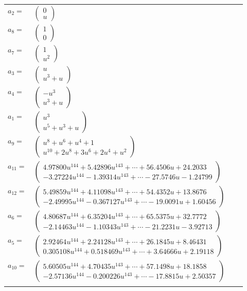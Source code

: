 \documentclass[1p]{elsarticle_modified}
\theoremstyle{definition}
\begin{document}
\begin{tabular}{m{7pt} m{180pt} m{7pt} m{180pt} }
\flushright $a_{2}=$&$\begin{pmatrix}0\\u\end{pmatrix}$ \\
\flushright $a_{8}=$&$\begin{pmatrix}1\\0\end{pmatrix}$ \\
\flushright $a_{7}=$&$\begin{pmatrix}1\\u^2\end{pmatrix}$ \\
\flushright $a_{3}=$&$\begin{pmatrix}u\\u^3+u\end{pmatrix}$ \\
\flushright $a_{4}=$&$\begin{pmatrix}- u^3\\u^3+u\end{pmatrix}$ \\
\flushright $a_{1}=$&$\begin{pmatrix}u^3\\u^5+u^3+u\end{pmatrix}$ \\
\flushright $a_{9}=$&$\begin{pmatrix}u^8+u^6+u^4+1\\u^{10}+2 u^8+3 u^6+2 u^4+u^2\end{pmatrix}$ \\
\flushright $a_{11}=$&$\begin{pmatrix}4.97800 u^{144}+5.42896 u^{143}+\cdots+56.4506 u+24.2033\\-3.27224 u^{144}-1.39314 u^{143}+\cdots-27.5746 u-1.24799\end{pmatrix}$ \\
\flushright $a_{12}=$&$\begin{pmatrix}5.49859 u^{144}+4.11098 u^{143}+\cdots+54.4352 u+13.8676\\-2.49995 u^{144}-0.367127 u^{143}+\cdots-19.0091 u+1.60456\end{pmatrix}$ \\
\flushright $a_{6}=$&$\begin{pmatrix}4.80687 u^{144}+6.35204 u^{143}+\cdots+65.5375 u+32.7772\\-2.14463 u^{144}-1.10343 u^{143}+\cdots-21.2231 u-3.92713\end{pmatrix}$ \\
\flushright $a_{5}=$&$\begin{pmatrix}2.92464 u^{144}+2.24128 u^{143}+\cdots+26.1845 u+8.46431\\0.305108 u^{144}+0.518469 u^{143}+\cdots+3.64666 u+2.19118\end{pmatrix}$ \\
\flushright $a_{10}=$&$\begin{pmatrix}5.60505 u^{144}+4.70435 u^{143}+\cdots+57.1498 u+18.1858\\-2.57136 u^{144}-0.200226 u^{143}+\cdots-17.8815 u+2.50357\end{pmatrix}$\\&\end{tabular}
\end{document}
